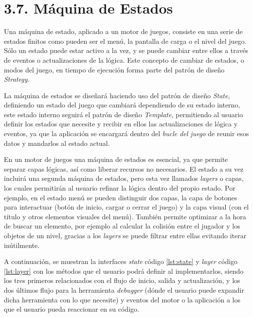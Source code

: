 \section*{3.7. Máquina de Estados}\label{sec:states-machine}

Una máquina de estado, aplicado a un motor de juegos, consiste en una serie de estados finitos
como pueden ser el menú, la pantalla de carga o el nivel del juego. Sólo un estado puede estar 
activo a la vez, y se puede cambiar entre ellos a través de eventos o actualizaciones de la
lógica\cite{what-state-machine}.
Este concepto de cambiar de estados, o modos del juego, en tiempo de ejecución forma parte del patrón de diseño \textit{Strategy}\cite{strategy-pattern}.

La máquina de estados se diseñará haciendo uso del patrón de diseño \textit{State}\cite{state-pattern},
definiendo un estado del juego que cambiará dependiendo de su estado interno, este estado interno seguirá el patrón de 
diseño \textit{Template}\cite{template-pattern}, permitiendo al usuario definir los estados que necesite y recibir en ellos
las actualizaciones de lógica y eventos, ya que la aplicación se encargará dentro del \textit{bucle del juego} de reunir esos datos
y mandarlos al estado actual.

En un motor de juegos una máquina de estados es esencial, ya que permite separar capas lógicas, así como liberar
recursos no necesarios. El estado a su vez incluirá una segunda máquina de estados, pero esta vez llamados
\textit{layers} o capas, los cuales permitirán al usuario refinar la lógica dentro del propio estado. Por ejemplo,
en el estado menú se pueden distinguir dos capas, la capa de botones para interactuar (botón de inicio, cargar o cerrar el juego)
y la capa visual (con el título y otros elementos visuales del menú). También permite optimizar a la hora de buscar un elemento,
por ejemplo al calcular la colisión entre el jugador y los objetos de un nivel, gracias a los \textit{layers} se puede filtrar entre ellas evitando
iterar inútilmente.

A continuación, se muestran la interfaces \textit{state} código \ref{lst:state} y \textit{layer} 
código \ref{lst:layer} con los métodos que el usuario podrá definir al implementarlos, siendo los tres primeros
relacionados con el flujo de inicio, salida y actualización, y los dos últimos flujo para la herramienta \textit{debugger}
(dónde el usuario puede expandir dicha herramienta con lo que necesite) y eventos del motor o la aplicación a los que
el usuario pueda reaccionar en su código.



